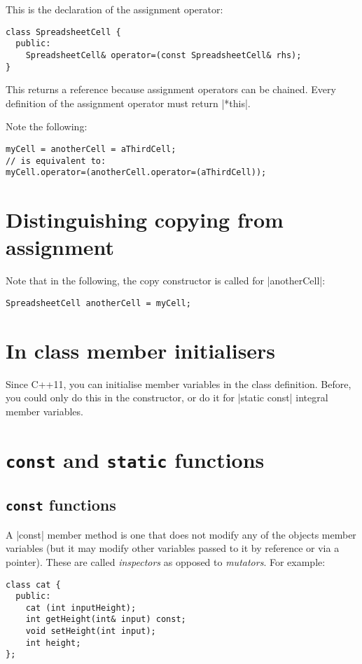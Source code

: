 \documentclass[a4paper,12pt,oneside]{book}
\begin{document}
{This is the declaration of the assignment operator:

\begin{lstlisting}
class SpreadsheetCell {
  public:
    SpreadsheetCell& operator=(const SpreadsheetCell& rhs);
}
\end{lstlisting}

This returns a reference because assignment operators can be chained. Every definition of the assignment operator must return \lst|*this|.

Note the following:
\begin{lstlisting}
myCell = anotherCell = aThirdCell;
// is equivalent to:
myCell.operator=(anotherCell.operator=(aThirdCell));
\end{lstlisting}

\section{Distinguishing copying from assignment}
Note that in the following, the copy constructor is called for \lst|anotherCell|:
\begin{lstlisting}
SpreadsheetCell anotherCell = myCell;
\end{lstlisting}
\section{In class member initialisers}
Since C++11, you can initialise member variables in the class definition. Before, you could only do this in the constructor, or do it for \lst|static const| integral member variables.


\sloppy
\section{\texttt{const} and \texttt{static} functions}
\subsection{\texttt{const} functions}
A \lst|const| member method is one that does not modify any of the objects member variables (but it may modify other variables passed to it by reference or via a pointer). These are called \emph{inspectors} as opposed to \emph{mutators}. For example:

\begin{lstlisting}
class cat {
  public:
    cat (int inputHeight);
    int getHeight(int& input) const;
    void setHeight(int input);
    int height;
};


\end{lstlisting}}
\end{document}
